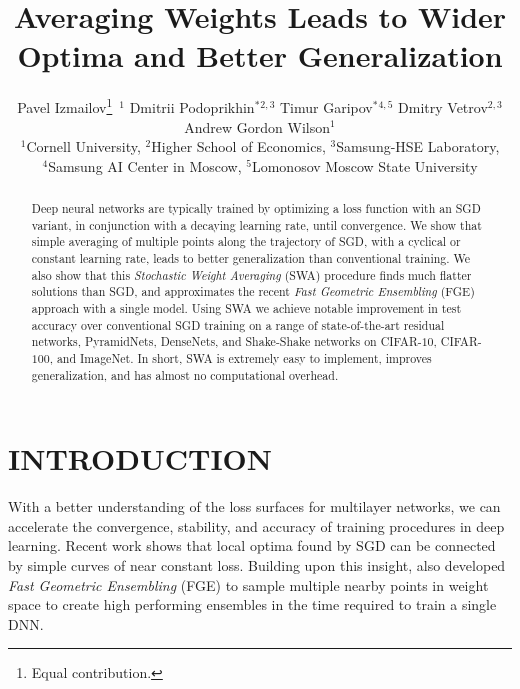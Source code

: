 \documentclass[letterpaper]{article}
\title{Averaging Weights Leads to Wider Optima and Better Generalization}
\author{
  Pavel Izmailov\thanks{\text{ }\text{ }Equal contribution.}\, $^1$ 
  \quad Dmitrii Podoprikhin$^*$$^{2,3}$ 
  \quad Timur Garipov$^*$$^{4,5}$ 
  \quad Dmitry Vetrov$^{2,3}$ 
  \quad Andrew Gordon Wilson$^1$ \\ 
  $^1$Cornell University, 
  $^2$Higher School of Economics, 
  $^3$Samsung-HSE Laboratory, \\
  $^4$Samsung AI Center in Moscow, 
  $^5$Lomonosov Moscow State University}
\begin{document}
\maketitle

\begin{abstract}


Deep neural networks are typically trained by optimizing a loss function with an
SGD variant, in conjunction with a decaying learning rate, until convergence.  We show that 
simple averaging of multiple points along the trajectory of SGD, with a cyclical
or constant learning rate, leads to better generalization than conventional training.
We also show that this \emph{Stochastic Weight Averaging} (SWA)
procedure finds much flatter solutions than SGD, and approximates the 
recent \emph{Fast Geometric Ensembling} (FGE) approach with a single model.
Using SWA we achieve notable improvement in test accuracy over
conventional SGD training on a range of state-of-the-art residual networks,
PyramidNets, DenseNets, and Shake-Shake networks on CIFAR-$10$, 
CIFAR-$100$, and ImageNet.  In short, SWA is extremely easy to implement, 
improves generalization, and has almost no computational overhead.
  
\end{abstract}

\section{INTRODUCTION}
\label{sec:intro}

With a better understanding of the loss surfaces for multilayer networks, we can accelerate the convergence, stability, and accuracy of training procedures in deep learning. Recent work \citep{garipov2018, draxler2018} shows 
that local optima found by SGD can be connected by simple curves of near constant loss.  Building upon this insight, \citet{garipov2018} also developed \emph{Fast Geometric Ensembling} (FGE) to sample multiple nearby points in weight space to create high performing ensembles in the time required to train a single DNN.
\end{document}
